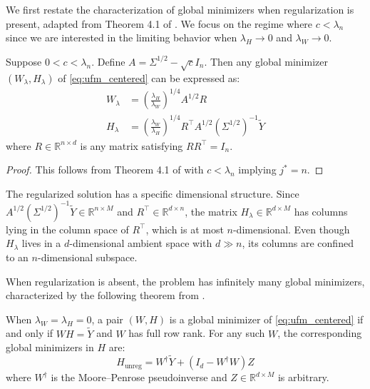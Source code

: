 We first restate the characterization of global minimizers when regularization is present, adapted from Theorem 4.1 of \citet{andriopoulos2024prevalence}. We focus on the regime where $c < \lambda_n$ since we are interested in the limiting behavior when $\lambda_H \to 0$ and $\lambda_W \to 0$.

\begin{theorem}
\label{thm:ufm_regularized}
Suppose $0 < c < \lambda_n$. Define $A = \Sigma^{1/2} - \sqrt{c} I_n$. Then any global minimizer $(W_\lambda, H_\lambda)$ of \eqref{eq:ufm_centered} can be expressed as:
\begin{align}
W_\lambda &= \left(\frac{\lambda_H}{\lambda_W}\right)^{1/4} A^{1/2} R \label{eq:w_lambda}\\
H_\lambda &= \left(\frac{\lambda_W}{\lambda_H}\right)^{1/4} R^\top A^{1/2} (\Sigma^{1/2})^{-1} \tilde{Y} \label{eq:h_lambda}
\end{align}
where $R \in \mathbb{R}^{n \times d}$ is any matrix satisfying $RR^\top = I_n$.
\end{theorem}

\begin{proof}
This follows from Theorem 4.1 of \citet{andriopoulos2024prevalence} with $c < \lambda_n$ implying $j^* = n$.
\end{proof}

The regularized solution has a specific dimensional structure. Since $A^{1/2}(\Sigma^{1/2})^{-1}\tilde{Y} \in \mathbb{R}^{n \times M}$ and $R^\top \in \mathbb{R}^{d \times n}$, the matrix $H_\lambda \in \mathbb{R}^{d \times M}$ has columns lying in the column space of $R^\top$, which is at most $n$-dimensional. Even though $H_\lambda$ lives in a $d$-dimensional ambient space with $d \gg n$, its columns are confined to an $n$-dimensional subspace.

When regularization is absent, the problem has infinitely many global minimizers, characterized by the following theorem from \citet{andriopoulos2024prevalence}.

\begin{theorem}
\label{thm:ufm_unregularized}
When $\lambda_W = \lambda_H = 0$, a pair $(W, H)$ is a global minimizer of \eqref{eq:ufm_centered} if and only if $WH = \tilde{Y}$ and $W$ has full row rank. For any such $W$, the corresponding global minimizers in $H$ are:
\begin{equation}
H_{\text{unreg}} = W^\dagger \tilde{Y} + (I_d - W^\dagger W)Z
\label{eq:h_unreg}
\end{equation}
where $W^\dagger$ is the Moore--Penrose pseudoinverse and $Z \in \mathbb{R}^{d \times M}$ is arbitrary.
\end{theorem}

